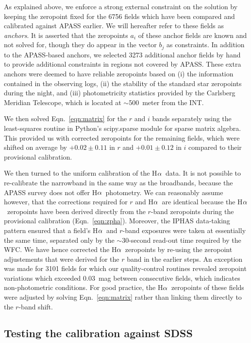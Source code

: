 \documentclass[useAMS,usenatbib]{mn2e}
\def\ha{\mbox{H$\rm \alpha$}}
\begin{document}
As explained above, we enforce a strong external constraint
on the solution by keeping the zeropoint fixed 
for the 6756 fields which have been compared
and calibrated against APASS earlier.
We will hereafter refer to these fields as \emph{anchors}.
It is asserted that the zeropoints $a_i$ of these anchor fields 
are known and not solved for,
though they do appear in the vector $b_j$ as constraints.
In addition to the APASS-based anchors, 
we selected 3273 additional anchor fields by hand
to provide additional constraints in regions not covered by APASS.
These extra anchors were deemed to have reliable zeropoints 
based on 
(i) the information contained in the observing logs,
(ii) the stability of the standard star zeropoints during the night, and
(iii) photometricity statistics provided by the Carlsberg Meridian Telescope,
which is located at $\sim$500~meter from the INT.

We then solved Eqn.~\ref{eqn:matrix} for the $r$ and $i$ bands
separately using the least-squares routine 
in Python's {\sc scipy.sparse} module for sparse matrix algebra.
This provided us with corrected zeropoints for the remaining fields,
which were shifted on average by $+0.02\pm0.11$ in $r$ 
and $+0.01\pm0.12$ in $i$ compared to their provisional calibration.

We then turned to the uniform calibration of the \ha\ data.
It is not possible to re-calibrate the narrowband 
in the same way as the broadbands,
because the APASS survey does not offer \ha\ photometry.
We can reasonably assume however,
that the corrections required for $r$ and \ha\ are identical
because the \ha\ zeropoints have been derived directly from the
$r$-band zeropoints during the provisional calibration (Eqn.~\ref{eqn:zpha}).
Moreover, the IPHAS data-taking pattern ensured 
that a field's \ha\ and $r$-band exposures
were taken at essentially the same time, 
separated only by the $\sim$30-second read-out time required by the WFC.
We have hence corrected the \ha\ zeropoints 
by re-using the zeropoint adjustements that were derived for the $r$ band
in the earlier steps.
An exception was made for 3101 fields
for which our quality-control routines revealed
zeropoint variations which exceeded 0.03~mag 
between consecutive fields,
which indicates non-photometric conditions.
For good practice, the \ha\ zeropoints of these fields
were adjusted by solving Eqn.~\ref{eqn:matrix}
rather than linking them directly to the $r$-band shift.

\subsection{Testing the calibration against SDSS}
\end{document}
